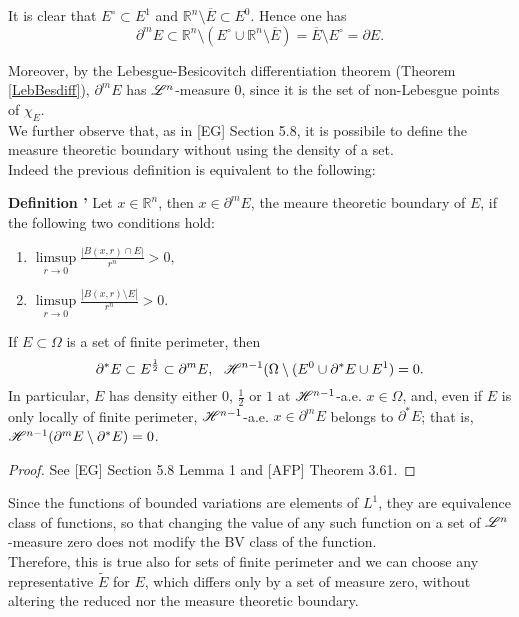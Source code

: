 \begin{remark} \label{essboundnull} It is clear that $E^{\circ} \subset E^{1}$ and $\mathbb{R}^{n} \setminus \overline E \subset E^{0}$. Hence one has 
\[ \partial^{m}E \subset \mathbb{R}^{n} \setminus (E^{\circ} \cup \mathbb{R}^{n} \setminus \overline E) = \overline E \setminus E^{\circ} = \partial E. \]

Moreover, by the Lebesgue-Besicovitch differentiation theorem (Theorem \ref{LebBesdiff}), $\partial^{m} E$ has $\mathscr{L}^{n}$-measure $0$, since it is the set of non-Lebesgue points of $\chi_{E}$.
\\

We further observe that, as in [EG] Section 5.8, it is possibile to define the measure theoretic boundary without using the density of a set.
\\
Indeed the previous definition is equivalent to the following:

\textbf{Definition \label{measuretheorintext}'} Let $x \in \mathbb{R}^{n}$, then $x \in \partial^{m}E$, the meaure theoretic boundary of $E$, if the following two conditions hold:
\begin{enumerate}
	\item $\displaystyle \limsup\limits_{r \to 0} \frac{|B(x,r) \cap E|}{r^{n}} > 0,$
	\item $\displaystyle \limsup\limits_{r \to 0} \frac{|B(x,r) \setminus E|}{r^{n}} > 0.$
\end{enumerate}
\end{remark}

\begin{theorem} \label{structhm2} If $E \subset \Omega$ is a set of finite perimeter, then
\[ \partial^{*}E \subset E^{\frac{1}{2}} \subset \partial^{m}E, \  \ \mathscr{H}^{n-1}(\Omega \setminus (E^{0} \cup \partial^{*}E \cup E^{1}) = 0. \]
In particular, $E$ has density either $0$, $\frac{1}{2}$ or $1$ at $\mathscr{H}^{n-1}$-a.e. $x \in \Omega$, and, even if $E$ is only locally of finite perimeter, $\mathscr{H}^{n-1}$-a.e. $x \in \partial^{m}E$ belongs to $\partial^{*}E$; that is, $\mathscr{H}^{n-1}(\partial^{m}E \setminus \partial^{*}E) = 0$.
\end{theorem}
\begin{proof} See [EG] Section 5.8 Lemma 1 and [AFP] Theorem 3.61.
\end{proof}

\begin{remark} \label{setrepr} Since the functions of bounded variations are elements of $L^{1}$, they are equivalence class of functions, so that changing the value of any such function on a set of $\mathscr{L}^{n}$-measure zero does not modify the BV class of the function.
\\
Therefore, this is true also for sets of finite perimeter and we can choose any representative $\widetilde{E}$ for $E$, which differs only by a set of measure zero, without altering the reduced nor the measure theoretic boundary.
\end{remark}

